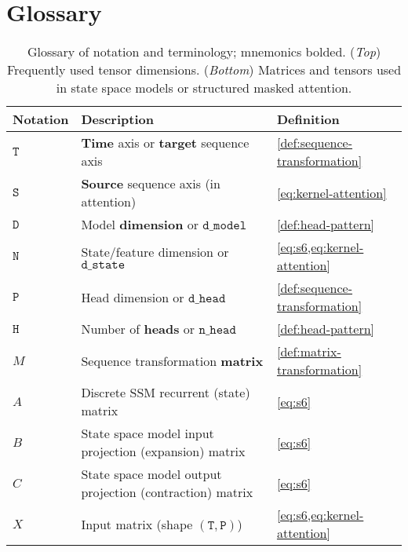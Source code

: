 \section{Glossary}
\label{sec:glossary}

\begin{table}[!h]
  \caption{
    Glossary of notation and terminology; mnemonics bolded.
    (\emph{Top}) Frequently used tensor dimensions.
    (\emph{Bottom}) Matrices and tensors used in state space models or structured masked attention.
  }
  \centering
  \begin{tabular}{@{}lll@{}}
    \toprule
    Notation       & Description                                                                & Definition \\
    \midrule
    $\mathtt{T}$   & \textbf{Time} axis or \textbf{target} sequence axis                        & \cref{def:sequence-transformation} \\
    $\mathtt{S}$   & \textbf{Source} sequence axis (in attention)                               & \cref{eq:kernel-attention} \\
    $\mathtt{D}$   & Model \textbf{dimension} or $\mathtt{d\_model}$                            & \cref{def:head-pattern} \\
    $\mathtt{N}$   & State/feature dimension or $\mathtt{d\_state}$                             & \cref{eq:s6,eq:kernel-attention} \\
    $\mathtt{P}$   & Head dimension or $\mathtt{d\_head}$                                       & \cref{def:sequence-transformation} \\
    $\mathtt{H}$   & Number of \textbf{heads} or $\mathtt{n\_head}$                             & \cref{def:head-pattern} \\
    \midrule
    $M$            & Sequence transformation \textbf{matrix}                                    & \cref{def:matrix-transformation} \\
    $A$            & Discrete SSM recurrent (state) matrix                                      & \cref{eq:s6} \\
    $B$            & State space model input projection (expansion) matrix                      & \cref{eq:s6} \\
    $C$            & State space model output projection (contraction) matrix                   & \cref{eq:s6} \\
    $X$            & Input matrix (shape $\mathtt{(T, P)}$)                                     & \cref{eq:s6,eq:kernel-attention} \\

\end{tabular}
\end{table}

